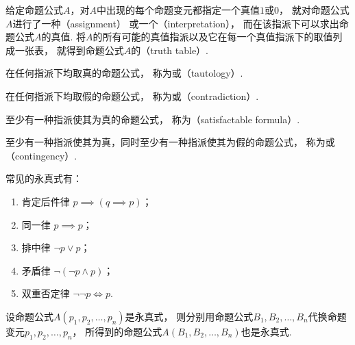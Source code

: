 给定命题公式\(A\)，对\(A\)中出现的每个命题变元都指定一个真值\(1\)或\(0\)，
就对命题公式\(A\)进行了一种（assignment）
或一个（interpretation），
而在该指派下可以求出命题公式\(A\)的真值.
将\(A\)的所有可能的真值指派以及它在每一个真值指派下的取值列成一张表，
就得到命题公式\(A\)的（truth table）.

在任何指派下均取真的命题公式，
称为或（tautology）.

在任何指派下均取假的命题公式，
称为或（contradiction）.

至少有一种指派使其为真的命题公式，
称为（satisfactable formula）.

至少有一种指派使其为真，同时至少有一种指派使其为假的命题公式，
称为或（contingency）.

常见的永真式有：
\begin{enumerate}
	\item 肯定后件律 \(p \implies (q \implies p)\)；
	\item 同一律 \(p \implies p\)；
	\item 排中律 \(\neg p \lor p\)；
	\item 矛盾律 \(\neg(\neg p \land p)\)；
	\item 双重否定律 \(\neg\neg p \iff p\).
\end{enumerate}

\begin{theorem}[永真式代入定理]
设命题公式\(A(p_1,p_2,\dotsc,p_n)\)是永真式，
则分别用命题公式\(B_1,B_2,\dotsc,B_n\)代换命题变元\(p_1,p_2,\dotsc,p_n\)，
所得到的命题公式\(A(B_1,B_2,\dotsc,B_n)\)也是永真式.
\end{theorem}


